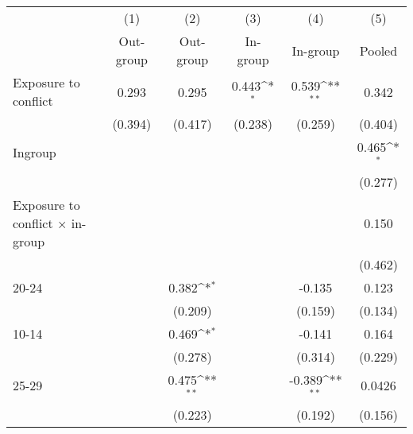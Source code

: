 {
\def\sym#1{\ifmmode^{#1}\else\(^{#1}\)\fi}
\begin{tabular}{l*{5}{c}}
\hline\hline
                    &\multicolumn{1}{c}{(1)}&\multicolumn{1}{c}{(2)}&\multicolumn{1}{c}{(3)}&\multicolumn{1}{c}{(4)}&\multicolumn{1}{c}{(5)}\\
                    &\multicolumn{1}{c}{Out-group}&\multicolumn{1}{c}{Out-group}&\multicolumn{1}{c}{In-group}&\multicolumn{1}{c}{In-group}&\multicolumn{1}{c}{Pooled}\\
\hline
Exposure to conflict&       0.293         &       0.295         &       0.443\sym{*}  &       0.539\sym{**} &       0.342         \\
                    &     (0.394)         &     (0.417)         &     (0.238)         &     (0.259)         &     (0.404)         \\
[1em]
Ingroup             &                     &                     &                     &                     &       0.465\sym{*}  \\
                    &                     &                     &                     &                     &     (0.277)         \\
[1em]
Exposure to conflict × in-group &                     &                     &                     &                     &       0.150         \\
                    &                     &                     &                     &                     &     (0.462)         \\
[1em]
20-24               &                     &       0.382\sym{*}  &                     &      -0.135         &       0.123         \\
                    &                     &     (0.209)         &                     &     (0.159)         &     (0.134)         \\
[1em]
10-14               &                     &       0.469\sym{*}  &                     &      -0.141         &       0.164         \\
                    &                     &     (0.278)         &                     &     (0.314)         &     (0.229)         \\
[1em]
25-29               &                     &       0.475\sym{**} &                     &      -0.389\sym{**} &      0.0426         \\
                    &                     &     (0.223)         &                     &     (0.192)         &     (0.156)         \\

\end{tabular}}
